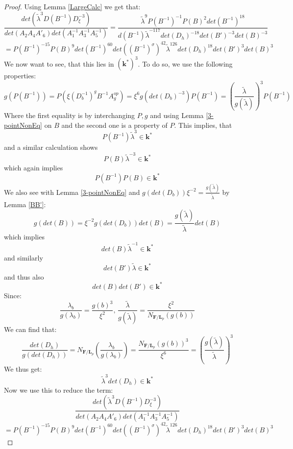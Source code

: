 \documentclass[12pt, oneside, reqno]{amsart}
\begin{document}
\begin{proof}
 Using Lemma \ref{LargeCalc} we get that:
 \[\frac{det(\tilde \lambda^3 D(B^{-1})D_{\xi}^{-3})}{det(A_2A_4A'_6)det(A_1^{-1}A_3^{-1}A_5^{-1})} =  \frac{\tilde \lambda^9 P(B^{-1})^{-1} P(B)^2 det(B^{-1})^{18}}{d(B^{-1}) \tilde \lambda^{-117} det(D_h)^{-18}det(B')^{-3}det(B)^{-3}}\]
 \[= P(B^{-1})^{-15} P(B)^9 det(B^{-1})^{60} det((B^{-1})^{\sigma})^{42} \tilde \lambda^{126} det(D_h)^{18}det(B')^3det(B)^3\]
 We now want to see, that this lies in $(\textbf{k}^*)^3$. To do so, we use the following properties:
\[g(P(B^{-1})) = P(\xi (D_b^{-1})^gB^{-1}A_g^{op}) = \xi^6 g(det(D_b)^{-3}) P(B^{-1}) = (\frac{\tilde \lambda}{g(\tilde \lambda)})^3P(B^{-1})\]
Where the first equality is by interchanging $P,g$ and using Lemma \ref{3-pointNonEq} on $B$ and the second one is a property of $P$. This implies, that 
\begin{equation} \label{eq:1P}
P(B^{-1}) \tilde \lambda^3 \in \textbf{k}^*
\end{equation}
and a similar calculation shows
\[P(B)\tilde \lambda^{-3} \in \textbf{k}^*\] 
which again implies 
\begin{equation} \label{eq:2Ps}
P(B^{-1})P(B)\in \textbf{k}^*
\end{equation}
We also see with Lemma \ref{3-pointNonEq} and $g(det(D_b))\xi^{-2} = \frac{g(\tilde \lambda)}{\tilde \lambda}$ by Lemma \ref{BB'}:
\[g(det(B)) = \xi^{-2} g(det(D_b)) det(B) = \frac{g(\tilde \lambda)}{\tilde \lambda} det(B)\]
which implies 
\begin{equation} \label{eq:1B}
det(B) \tilde \lambda^{-1} \in \textbf{k}^*
\end{equation}
and similarly 
\[det(B') \tilde \lambda \in \textbf{k}^*\] 
and thus also 
\begin{equation} \label{eq:2Bs}
det(B)det(B') \in \textbf{k}^*
\end{equation}
Since:
\[\frac{\lambda_b}{g(\lambda_b)} = \frac{g(b)^3}{\xi^2}, \, \frac{\tilde \lambda}{g(\tilde \lambda)} = \frac{\xi^2}{N_{\textbf{F}/\textbf{L}_p}(g(b))}\]
We can find that:
\[\frac{det(D_h)}{g(det(D_h))} = N_{\textbf{F}/\textbf{L}_p}(\frac{\lambda_b}{g(\lambda_b)}) = \frac{N_{\textbf{F}/\textbf{L}_p}(g(b))^3}{\xi^6} =(\frac{g(\tilde \lambda)}{\tilde \lambda})^3\]
We thus get:
\begin{equation} \label{eq:Dh}
    \tilde \lambda^3 det(D_h) \in \textbf{k}^*
\end{equation}
Now we use this to reduce the term:
\[\frac{det(\tilde \lambda^3 D(B^{-1})D_{\xi}^{-3})}{det(A_2A_4A'_6)det(A_1^{-1}A_3^{-1}A_5^{-1})}\] 
\[= P(B^{-1})^{-15} P(B)^9 det(B^{-1})^{60} det((B^{-1})^{\sigma})^{42} \tilde \lambda^{126} det(D_h)^{18}det(B')^3det(B)^3\]

\end{proof}
\end{document}
